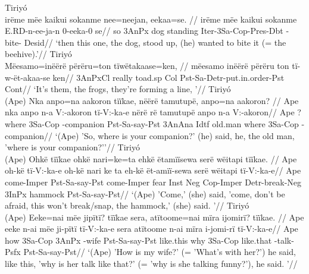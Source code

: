 \documentclass[10pt]{article}
\begin{document}
\pex\label{}    \a Tiriyó\\
    \label{dados-07-frog-story-marciano-p-089-037}        \begingl
        \glpreamble irëme mëe   kaikui sokanme   nee=neejan,               eekaa=se. //
        \gla irëme mëe kaikui sokanme E.RD-n-ee-ja-n 0-eeka-0 se//
        \glb so 3AnPx dog standing Iter-3Sa-Cop-Pres-Dbt -bite- Desid//
            \glft ‘then this one, the dog, stood up, (he) wanted to bite it (= the beehive).’//  
        \endgl 
    \a Tiriyó\\
    \label{dados-07-frog-story-marciano-p-093-096}        \begingl
        \glpreamble Mëesamo=inëërë      përëru=ton    tïwëtakaase=ken, //
        \gla mëesamo inëërë përëru ton tï-w-ët-akaa-se ken//
        \glb 3AnPxCl really toad.sp Col Pst-Sa-Detr-put.in.order-Pst Cont//
            \glft ‘It's them, the frogs, they're forming a line,  ’//  
        \endgl 
    \a Tiriyó\\
    \label{dados-09-kereramake-p-037-179}        \begingl
        \glpreamble (Ape) Nka  anpo=na        aakoron        tïïkae,             nëërë       tamutupë,  anpo=na        aakoron? //
        \gla Ape nka anpo n-a V:-akoron tï-V:-ka-e nërë rë tamutupë anpo n-a V:-akoron//
        \glb Ape ? where 3Sa-Cop -companion Pst-Sa-say-Pst 3AnAna Idtf old.man where 3Sa-Cop -companion//
            \glft ‘(Ape) 'So, where is your companion?' (he) said, he, the old man, 'where is your companion?'’//  
        \endgl 
    \a Tiriyó\\
    \label{dados-09-kereramake-p-043-304}        \begingl
        \glpreamble (Ape) Ohkë        tïïkae             ohkë        nari=ke=ta      ehkë       ëtamïïsewa        serë wëitapi tïïkae. //
        \gla Ape oh-kë tï-V:-ka-e oh-kë nari ke ta eh-kë ët-amïï-sewa serë wëitapi tï-V:-ka-e//
        \glb Ape come-Imper Pst-Sa-say-Pst come-Imper fear Inst Neg Cop-Imper Detr-break-Neg 3InPx hammock Pst-Sa-say-Pst//
            \glft ‘(Ape) 'Come,' (she) said, 'come, don't be afraid, this won't break/snap, the hammock,' (she) said.  ’//  
        \endgl 
    \a Tiriyó\\
    \label{dados-09-kereramake-p-047-354}        \begingl
        \glpreamble (Ape) Eeke=nai       mëe   jipïtï?   tïïkae             sera,     atïtoome=nai mïra      ijomirï?        tïïkae. //
        \gla Ape eeke n-ai mëe ji-pïtï tï-V:-ka-e sera atïtoome n-ai mïra i-jomi-rï tï-V:-ka-e//
        \glb Ape how 3Sa-Cop 3AnPx -wife Pst-Sa-say-Pst like.this why 3Sa-Cop like.that -talk-Psfx Pst-Sa-say-Pst//
            \glft ‘(Ape) 'How is my wife?' (= 'What's with her?') he said, like this, 'why is her talk like that?' (= 'why is she talking funny?'), he said.  ’//  
        \endgl 
\xe
\end{document}
